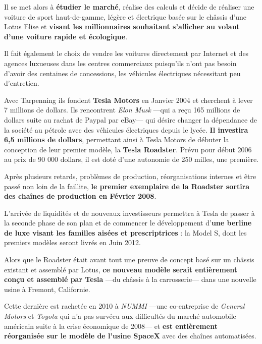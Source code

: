 Il se met alors à \textbf{étudier le marché}, réalise des calculs et décide de réaliser une voiture de sport haut-de-gamme, légère et électrique basée sur le châssis d'une Lotus Elise et \textbf{visant les millionnaires souhaitant s'afficher au volant d'une voiture rapide et écologique}.

Il fait également le choix de vendre les voitures directement par Internet et des agences luxueuses dans les centres commerciaux puisqu'ils n'ont pas besoin d'avoir des centaines de concessions, les véhicules électriques nécessitant peu d'entretien.

\vspace{5mm}

Avec Tarpenning ils fondent \textbf{Tesla Motors} en Janvier 2004 et cherchent à lever 7 millions de dollars. Ils rencontrent \textit{Elon Musk} ---qui a reçu 165 millions de dollars suite au rachat de Paypal par eBay--- qui désire changer la dépendance de la société au pétrole avec des véhicules électriques depuis le lycée. \textbf{Il investira 6,5 millions de dollars}, permettant ainsi à Tesla Motors de débuter la conception de leur premier modèle, la \textbf{Tesla Roadster}. Prévu pour début 2006 au prix de 90 000 dollars, il est doté d'une autonomie de 250 milles, une première.

Après plusieurs retards, problèmes de production, réorganisations internes et être passé non loin de la faillite, \textbf{le premier exemplaire de la Roadster sortira des chaînes de production en Février 2008}.

\vspace{5mm}

L'arrivée de liquidités et de nouveaux investisseurs permettra à Tesla de passer à la seconde phase de son plan\supercite{TeslaSecretMasterPlan} et de commencer le développement d'\textbf{une berline de luxe visant les familles aisées et prescriptrices} : la Model S, dont les premiers modèles seront livrés en Juin 2012.

Alors que le Roadster était avant tout une preuve de concept basé sur un châssis existant et assemblé par Lotus\supercite{LotusPosition}, \textbf{ce nouveau modèle serait entièrement conçu et assemblé par Tesla} ---du châssis à la carrosserie--- dans une nouvelle usine à Fremont, Californie.

Cette dernière est rachetée en 2010 à \textit{NUMMI} ---une co-entreprise de \textit{General Motors} et \textit{Toyota} qui n'a pas survécu aux difficultés du marché automobile américain suite à la crise économique de 2008--- et \textbf{est entièrement réorganisée sur le modèle de l'usine SpaceX} avec des chaînes automatisées.

